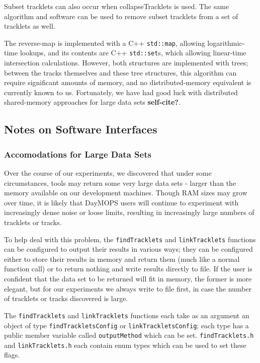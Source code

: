 Subset tracklets can also occur when collapseTracklets is used.  The
same algorithm and software can be used to remove subset tracklets
from a set of tracklets as well.

The reverse-map is implemented with a C++ {\tt std::map}, allowing
logarithmic-time lookups, and its contents are C++ {\tt std::set}s,
which allowing linear-time intersection calculations.  However, both
structures are implemented with trees; between the tracks themselves
and these tree structures, this algorithm can require significant
amounts of memory, and no distributed-memory equivalent is currently
known to us.  Fortunately, we have had good luck with distributed
shared-memory approaches for large data sets {\bf self-cite?}.



\subsection{Notes on Software Interfaces}

\subsubsection{Accomodations for Large Data Sets}
\label{largeData}
Over the course of our experiments, we discovered that under some
circumstances, tools may return some very large data sets - larger
than the memory available on our development machines.  Though RAM
sizes may grow over time, it is likely that DayMOPS users will
continue to experiment with increasingly dense noise or loose limits,
resulting in increasingly large numbers of tracklets or tracks.

To help deal with this problem, the {\tt  findTracklets} and
{\tt linkTracklets} functions can be configured to output their results
in various ways; they can be configured either to store their results
in memory and return them (much like a normal function call) or to
return nothing and write results directly to file.  If the user is
confident that the data set to be returned will fit in memory, the
former is more elegant, but for our experiments we always write to
file first, in case the number of tracklets or tracks discovered is
large.

The {\tt findTracklets} and {\tt linkTracklets} functions each take as
an argument an object of type {\tt findTrackletsConfig} or
{\tt linkTrackletsConfig}; each type has a public member variable
called {\tt outputMethod} which can be set.  {\tt findTracklets.h} and
{\tt linkTracklets.h} each contain enum types which can be used to set
these flags.

